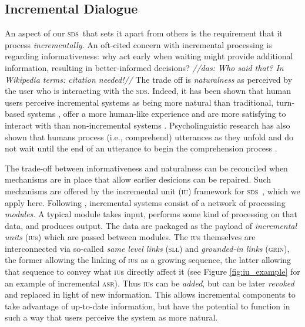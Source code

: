 \documentclass[11pt]{article}
\newcommand{\das}[1]{{\color{red}\emph{//das: #1//}}}
\newcommand{\sds}[0]{\textsc{sds}}
\newcommand{\asr}[0]{\textsc{asr}}
\newcommand{\iu}[0]{\textsc{iu}}
\begin{document}
\subsection{Incremental Dialogue}

An aspect of our \sds\ that sets it apart from others is the requirement that it process \emph{incrementally}. An oft-cited concern with incremental processing is regarding informativeness: why act early when waiting might provide additional information, resulting in better-informed decisions? 
\das{Who said that? In Wikipedia terms: citation needed!}
The trade off is \emph{naturalness} as perceived by the user who is interacting with the \sds. Indeed, it has been shown that human users perceive incremental systems as being more natural than traditional, turn-based systems \cite{Aist2006,Skantze2009,skantze2010sigdial,Asri2014}, offer a more human-like experience  \cite{Edlund2008b} and are more satisfying to interact with than non-incremental systems \cite{Aistetal:incrunder-short}. Psycholinguistic research has also shown that humans process (i.e., comprehend) utterances as they unfold and do not wait until the end of an utterance to begin the comprehension process \cite{Tanenhaus1995,Spivey_2002tw}. 

The trade-off between informativeness and naturalness can be reconciled when mechanisms are in place that allow earlier desicions can be repaired. Such mechanisms are offered by the incremental unit (\iu) framework for \sds\ \cite{Schlangen2011}, which we apply here. Following , incremental systems consist of a network of processing \emph{modules}. A typical module takes input, performs some kind of processing on that data, and produces output. The data are packaged as the payload of \emph{incremental units} (\textsc{iu}s) which are passed between modules. The \textsc{iu}s themselves are interconnected via so-called \emph{same level links} (\textsc{sll}) and \emph{grounded-in links} (\textsc{grin}), the former allowing the linking of \textsc{iu}s as a growing sequence, the latter allowing that sequence to convey what \textsc{iu}s directly affect it (see Figure \ref{fig:iu_example} for an example of incremental \asr). Thus \iu s can be \emph{added}, but can be later \emph{revoked} and replaced in light of new information. This allows incremental components to take advantage of up-to-date information, but have the potential to function in such a way that users perceive the system as more natural.
\end{document}

